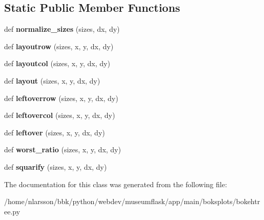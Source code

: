 \subsection*{Static Public Member Functions}
\begin{DoxyCompactItemize}
\item 
\mbox{\label{classboksplots_1_1bokehtree_1_1BokehTree_a27b94b75a9ebfc9717f1ee71a7b02b2e}} 
def {\bfseries normalize\+\_\+sizes} (sizes, dx, dy)
\item 
\mbox{\label{classboksplots_1_1bokehtree_1_1BokehTree_aa8cb72c1ab3400e83c51630629eb8423}} 
def {\bfseries layoutrow} (sizes, x, y, dx, dy)
\item 
\mbox{\label{classboksplots_1_1bokehtree_1_1BokehTree_ae5ead447557ba4b7da5ab2af54657218}} 
def {\bfseries layoutcol} (sizes, x, y, dx, dy)
\item 
\mbox{\label{classboksplots_1_1bokehtree_1_1BokehTree_a6e1150c1b6ab311d3b927ac5826a5188}} 
def {\bfseries layout} (sizes, x, y, dx, dy)
\item 
\mbox{\label{classboksplots_1_1bokehtree_1_1BokehTree_a8b5c59d79a8e1baecb762f482f0e9504}} 
def {\bfseries leftoverrow} (sizes, x, y, dx, dy)
\item 
\mbox{\label{classboksplots_1_1bokehtree_1_1BokehTree_a02dbbb9f97623dc5280aa085275802ea}} 
def {\bfseries leftovercol} (sizes, x, y, dx, dy)
\item 
\mbox{\label{classboksplots_1_1bokehtree_1_1BokehTree_a2a40b29fec3a1f8d28616d486f771ba2}} 
def {\bfseries leftover} (sizes, x, y, dx, dy)
\item 
\mbox{\label{classboksplots_1_1bokehtree_1_1BokehTree_a299d3cf53b7796ae996a287aa7d6e780}} 
def {\bfseries worst\+\_\+ratio} (sizes, x, y, dx, dy)
\item 
\mbox{\label{classboksplots_1_1bokehtree_1_1BokehTree_ae84b5df91885ab14d872db252a7f3986}} 
def {\bfseries squarify} (sizes, x, y, dx, dy)
\end{DoxyCompactItemize}


The documentation for this class was generated from the following file\+:\begin{DoxyCompactItemize}
\item 
/home/nlarsson/bbk/python/webdev/museumflask/app/main/boksplots/bokehtree.\+py\end{DoxyCompactItemize}
